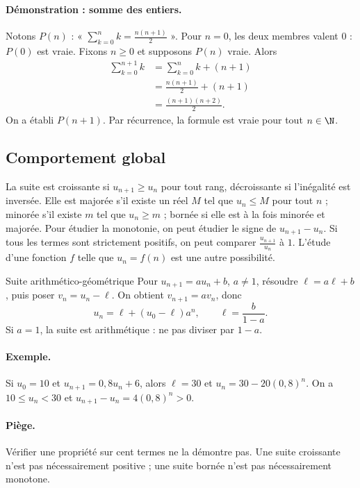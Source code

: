 \paragraph{Démonstration : somme des entiers.} Notons $P(n)$ : « $\sum_{k=0}^n k=\frac{n(n+1)}{2}$ ».
Pour $n=0$, les deux membres valent $0$ : $P(0)$ est vraie.
Fixons $n\ge0$ et supposons $P(n)$ vraie. Alors
\[\begin{aligned}\sum_{k=0}^{n+1}k&=\sum_{k=0}^nk+(n+1)\\&=\frac{n(n+1)}2+(n+1)\\&=\frac{(n+1)(n+2)}2.\end{aligned}\]
On a établi $P(n+1)$. Par récurrence, la formule est vraie pour tout $n\in\N$.
\subsection{Comportement global}
La suite est croissante si $u_{n+1}\ge u_n$ pour tout rang, décroissante si l'inégalité est inversée. Elle est majorée s'il existe un réel $M$ tel que $u_n\le M$ pour tout $n$ ; minorée s'il existe $m$ tel que $u_n\ge m$ ; bornée si elle est à la fois minorée et majorée.
Pour étudier la monotonie, on peut étudier le signe de $u_{n+1}-u_n$. Si tous les termes sont strictement positifs, on peut comparer $\frac{u_{n+1}}{u_n}$ à $1$. L'étude d'une fonction $f$ telle que $u_n=f(n)$ est une autre possibilité.
\begin{methode}{Suite arithmético-géométrique}
Pour $u_{n+1}=au_n+b$, $a\ne1$, résoudre $\ell=a\ell+b$, puis poser $v_n=u_n-\ell$. On obtient $v_{n+1}=av_n$, donc
\[u_n=\ell+(u_0-\ell)a^n,\qquad\ell=\frac{b}{1-a}.\]
Si $a=1$, la suite est arithmétique : ne pas diviser par $1-a$.
\end{methode}
\paragraph{Exemple.} Si $u_0=10$ et $u_{n+1}=0{,}8u_n+6$, alors $\ell=30$ et $u_n=30-20(0{,}8)^n$. On a $10\le u_n<30$ et $u_{n+1}-u_n=4(0{,}8)^n>0$.
\paragraph{Piège.} Vérifier une propriété sur cent termes ne la démontre pas. Une suite croissante n'est pas nécessairement positive ; une suite bornée n'est pas nécessairement monotone.


